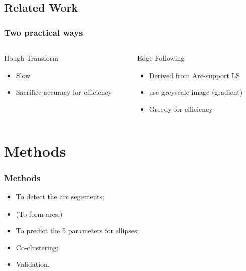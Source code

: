 \documentclass[aspectratio=169]{beamer}
\begin{document}
    \subsection{Related Work}
    \begin{frame}
        \frametitle{Two practical ways}
        
        

        \begin{columns}
            \begin{column}{.5\linewidth}
                Hough Transform
                \begin{itemize}
                    \item Slow
                    \item Sacrifice accuracy for efficiency
                \end{itemize}
            \end{column}
            \begin{column}{.5\linewidth}
                Edge Following
                \begin{itemize}
                    \item Derived from Arc-support LS 
                    \item use greyscale image (gradient)
                    \item Greedy for efficiency
                \end{itemize}
            \end{column}
        \end{columns}
        
    \end{frame}
    \section{Methods}
    \begin{frame}
        \frametitle{Methods}
    
        \begin{itemize}
            \item To detect the arc segements;
            \item (To form arcs;)
            \item To predict the 5 parameters for ellipses;
            \item Co-clustering;
            \item Validation.
        \end{itemize}
    
    \end{frame}
\end{document}
